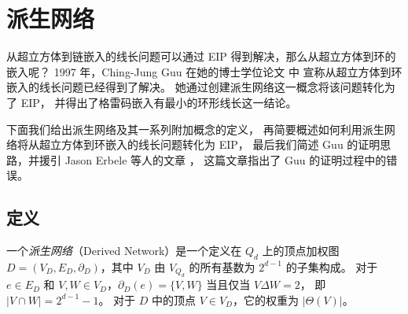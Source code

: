 \section{派生网络}
\label{Section 3.2}

从超立方体到链嵌入的线长问题可以通过 EIP 得到解决，那么从超立方体到环的嵌入呢？
1997 年，Ching-Jung Guu 在她的博士学位论文 \cite{Guu.1997} 中
宣称从超立方体到环嵌入的线长问题已经得到了解决。
她通过创建派生网络这一概念将该问题转化为了 EIP，
并得出了格雷码嵌入有最小的环形线长这一结论。

下面我们给出派生网络及其一系列附加概念的定义，
再简要概述如何利用派生网络将从超立方体到环嵌入的线长问题转化为 EIP，
最后我们简述 Guu 的证明思路，并援引 Jason Erbele 等人的文章 \cite{Erbele.2003}，
这篇文章指出了 Guu 的证明过程中的错误。

\subsection{定义}
\label{Subsection 3.2.1}

一个\emph{派生网络}（Derived Network）是一个定义在 $Q_d$ 上的顶点加权图
$D = (V_D, E_D, \partial_D)$，其中 $V_D$ 由 $V_{Q_d}$ 的所有基数为 $2^{d - 1}$ 的子集构成。
对于 $e \in E_D$ 和 $V, W \in V_D$，$\partial_D(e) = \{V, W\}$ 当且仅当 $V \Delta W = 2$，
即 $|V \cap W| = 2^{d - 1} - 1$。
对于 $D$ 中的顶点 $V \in V_D$，它的权重为 $|\Theta(V)|$。

